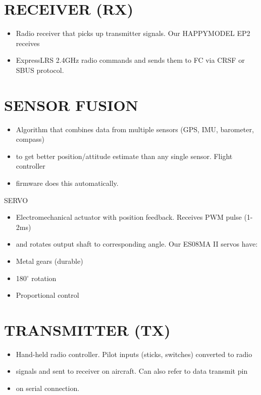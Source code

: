\documentclass[11pt,letterpaper]{article}
\begin{document}
\section{RECEIVER (RX)}

\begin{itemize}
  \item Radio receiver that picks up transmitter signals. Our HAPPYMODEL EP2 receives
  \item ExpressLRS 2.4GHz radio commands and sends them to FC via CRSF or SBUS protocol.
\end{itemize}

\section{SENSOR FUSION}

\begin{itemize}
  \item Algorithm that combines data from multiple sensors (GPS, IMU, barometer, compass)
  \item to get better position/attitude estimate than any single sensor. Flight controller
  \item firmware does this automatically.
\end{itemize}

SERVO\par

\begin{itemize}
  \item Electromechanical actuator with position feedback. Receives PWM pulse (1-2ms)
  \item and rotates output shaft to corresponding angle. Our ES08MA II servos have:
  \item Metal gears (durable)
  \item 180$^\circ$ rotation
  \item Proportional control
\end{itemize}

\section{TRANSMITTER (TX)}

\begin{itemize}
  \item Hand-held radio controller. Pilot inputs (sticks, switches) converted to radio
  \item signals and sent to receiver on aircraft. Can also refer to data transmit pin
  \item on serial connection.
\end{itemize}
\end{document}
